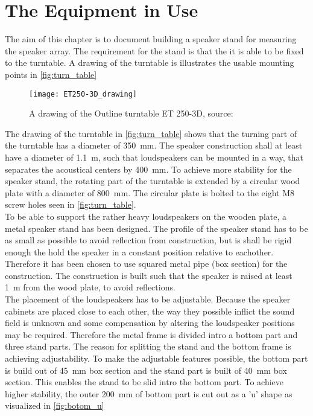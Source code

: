 \section{The Equipment in Use}\label{sec:hardware}
The aim of this chapter is to document building a speaker stand for measuring the speaker array. The requirement for the stand is that the it is able to be fixed to the turntable. A drawing of the turntable is illustrates the usable mounting points in \autoref{fig:turn_table}


 \begin{figure}[H]
	\centering
	\texttt{[image: ET250-3D\_drawing]}
	\caption{A drawing of the Outline turntable ET 250-3D, source: \citep{ET250-3D}}
		\label{fig:turn_table}
\end{figure}



The drawing of the turntable in \autoref{fig:turn_table} shows that the turning part of the turntable has a diameter of \SI{350}{\milli\meter}. The speaker construction shall at least have a diameter of \SI{1.1}{\meter}, such that loudspeakers can be mounted in a way, that separates the acoustical centers by \SI{400}{\milli\meter}. To achieve more stability for the speaker stand, the rotating part of the turntable is extended by a circular wood plate with a diameter of \SI{800}{\milli\meter}. The circular plate is bolted to the eight M8 screw holes seen in \autoref{fig:turn_table}. \\
To be able to support the rather heavy loudspeakers on the wooden plate, a metal speaker stand has been designed. The profile of the speaker stand has to be as small as possible to avoid reflection from construction, but is shall be rigid enough the hold the speaker in a constant position relative to eachother. Therefore it has been chosen to use squared metal pipe (box section) for the construction. The construction is built such that the speaker is raised at least \SI{1}{\meter} from the wood plate, to avoid reflections.\\
The placement of the loudspeakers has to be adjustable. Because the speaker cabinets are placed close to each other, the way they possible inflict the sound field is unknown and some compensation by altering the loudspeaker positions may be required. Therefore the metal frame is divided intro a bottom part and three stand parts. The reason for splitting the stand and the bottom frame is achieving adjustability. To make the adjustable features possible, the bottom part is build out of \SI{45}{\milli\meter} box section and the stand part is built of \SI{40}{\milli\meter} box section. This enables the stand to be slid intro the bottom part. To achieve higher stability, the outer \SI{200}{\milli\meter} of bottom part is cut out as a 'u' shape as visualized in \autoref{fig:botom_u}

